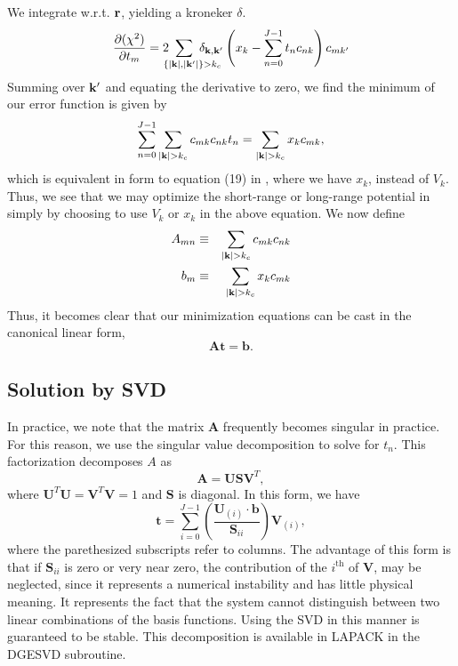 \documentclass{article}
\begin{document}
We integrate w.r.t. $\mathbf{r}$, yielding a kroneker $\delta$.
\begin{equation}
\frac{\partial (\chi^2)}{\partial t_{m}} =
2 \ns\ns\ns\ns\ns\ns\ns 
\sum_{\ \ \ \ \{|\vk|,|\vk'|\}>k_c} \ns\ns\ns\ns\ns\ns\ns \delta_{\vk, \vk'} 
\left(x_k -\sum_{n=0}^{J-1} t_n c_{nk} \right) c_{mk'}
\end{equation}
Summing over $\mathbf{k}'$ and equating the derivative to zero, we find the
minimum of our error function is given by
\begin{equation}
\sum_{n=0}^{J-1} \sum_{|\vk|>k_c} c_{mk}c_{nk} t_n = 
\sum_{|\vk|>k_c} x_k c_{mk},
\end{equation}
which is equivalent in form to equation (19) in \cite{Natoli}, where
we have $x_k$, instead of $V_k$.  Thus, we see that we may optimize
the short-range or long-range potential in simply by choosing to use
$V_k$ or $x_k$ in the above equation.  We now define
\begin{eqnarray}
A_{mn} & \equiv & \sum_{|\vk|>k_c} c_{mk} c_{nk} \\
b_{m} & \equiv & \sum_{|\vk|>k_c} x_k c_{mk}
\end{eqnarray}
Thus, it becomes clear that our minimization equations can be cast in
the canonical linear form,
\newcommand{\bA}{\mathbf{A}}
\newcommand{\bU}{\mathbf{U}}
\newcommand{\bV}{\mathbf{V}}
\newcommand{\bb}{\mathbf{b}}
\newcommand{\bS}{\mathbf{S}}
\begin{equation}
\bA\mathbf{t} = \mathbf{b}.
\end{equation}
\subsection{Solution by SVD}
In practice, we note that the matrix $\bA$ frequently becomes singular
in practice.  For this reason, we use the singular value decomposition
to solve for $t_n$.  This factorization decomposes $A$ as
\begin{equation}
\bA = \bU \bS \bV^T,
\end{equation}
where $\bU^T\bU = \bV^T\bV = 1$ and $\bS$ is diagonal.  In this form, we have
\begin{equation}
\mathbf{t} = \sum_{i=0}^{J-1} \left( \frac{\bU_{(i)} \cdot
  \bb}{\bS_{ii}} \right) \bV_{(i)},
\end{equation}
where the parethesized subscripts refer to columns.  The advantage of
this form is that if $\bS_{ii}$ is zero or very near zero, the
contribution of the $i^{\text{th}}$ of $\bV$, may be neglected, since
it represents a numerical instability and has little physical
meaning.  It represents the fact that the system cannot distinguish
between two linear combinations of the basis functions.  Using the SVD
in this manner is guaranteed to be stable.  This decomposition is
available in LAPACK in the DGESVD subroutine.
\end{document}
